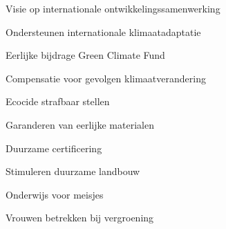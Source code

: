 
\begin{visie-concept}{Visie op internationale ontwikkelingssamenwerking}\end{visie-concept}

\begin{voorstel-concept}{Ondersteunen internationale klimaatadaptatie}\end{voorstel-concept}
\begin{voorstel-concept}{Eerlijke bijdrage Green Climate Fund}\end{voorstel-concept}
\begin{voorstel-concept}{Compensatie voor gevolgen klimaatverandering}\end{voorstel-concept}
\begin{voorstel-concept}{Ecocide strafbaar stellen}\end{voorstel-concept}
\begin{voorstel-concept}{Garanderen van eerlijke materialen}\end{voorstel-concept}
\begin{voorstel-concept}{Duurzame certificering}\end{voorstel-concept}
\begin{voorstel-concept}{Stimuleren duurzame landbouw}\end{voorstel-concept}
\begin{voorstel-concept}{Onderwijs voor meisjes}\end{voorstel-concept}
\begin{voorstel-concept}{Vrouwen betrekken bij vergroening}\end{voorstel-concept}
